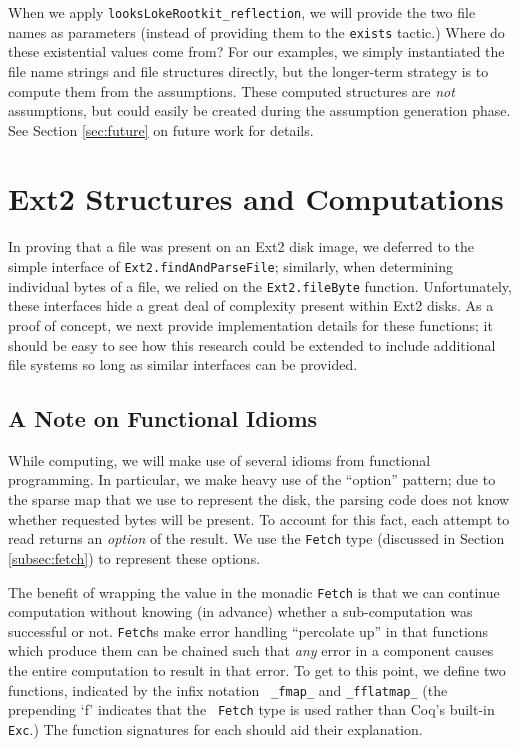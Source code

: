 \documentclass[nocopyrightspace]{sigplanconf}
\begin{document}
When we apply {\tt looksLokeRootkit\_reflection}, we will provide the two file
names as parameters (instead of providing them to the {\tt exists} tactic.)
Where do these existential values come from? For our examples, we simply
instantiated the file name strings and file structures directly, but the
longer-term strategy is to compute them from the assumptions. These computed
structures are {\em not} assumptions, but could easily be created during the
assumption generation phase. See Section \ref{sec:future} on future work for
details.

\section{Ext2 Structures and Computations}
\label{sec:ext2}

In proving that a file was present on an Ext2 disk image, we deferred to the
simple interface of {\tt Ext2.findAndParseFile}; similarly, when determining
individual bytes of a file, we relied on the {\tt Ext2.fileByte} function.
Unfortunately, these interfaces hide a great deal of complexity present within
Ext2 disks. As a proof of concept, we next provide implementation details for
these functions; it should be easy to see how this research could be extended
to include additional file systems so long as similar interfaces can be
provided.

\subsection{A Note on Functional Idioms}
\label{subsec:functionalext2}

While computing, we will make use of several idioms from functional
programming.  In particular, we make heavy use of the ``option'' pattern; due
to the sparse map that we use to represent the disk, the parsing code does not
know whether requested bytes will be present. To account for this fact, each
attempt to read returns an {\em option} of the result. We use the {\tt Fetch}
type (discussed in Section \ref{subsec:fetch}) to represent these options.

The benefit of wrapping the value in the monadic {\tt Fetch} is that we can
continue computation without knowing (in advance) whether a sub-computation
was successful or not. {\tt Fetch}s make error handling ``percolate up'' in
that functions which produce them can be chained such that {\em any} error in
a component causes the entire computation to result in that error. To get to
this point, we define two functions, indicated by the infix notation {\tt
\_fmap\_} and {\tt \_fflatmap\_} (the prepending `f' indicates that the {\tt
Fetch} type is used rather than Coq's built-in {\tt Exc}.) The function
signatures for each should aid their explanation.
\end{document}
